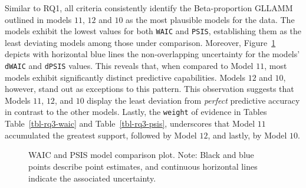 \documentclass[
]{agujournal2019}
\begin{document}
Similar to RQ1, all criteria consistently identify the Beta-proportion
GLLAMM outlined in models \(11\), \(12\) and \(10\) as the most
plausible models for the data. The models exhibit the lowest values for
both \texttt{WAIC} and \texttt{PSIS}, establishing them as the least
deviating models among those under comparison. Moreover,
Figure~\ref{fig-rq3-waic-psis} depicts with horizontal blue lines the
non-overlapping uncertainty for the models' \texttt{dWAIC} and
\texttt{dPSIS} values. This reveals that, when compared to Model \(11\),
most models exhibit significantly distinct predictive capabilities.
Models \(12\) and \(10\), however, stand out as exceptions to this
pattern. This observation suggests that Models \(11\), \(12\), and
\(10\) display the least deviation from \emph{perfect} predictive
accuracy in contrast to the other models. Lastly, the \texttt{weight} of
evidence in Tables Table~\ref{tbl-rq3-waic} and
Table~\ref{tbl-rq3-psis}, underscores that Model \(11\) accumulated the
greatest support, followed by Model \(12\), and lastly, by Model \(10\).

\label{cell-fig-rq3-waic-psis}
\begin{figure}[H]


\caption{\label{fig-rq3-waic-psis}WAIC and PSIS model comparison plot.
Note: Black and blue points describe point estimates, and continuous
horizontal lines indicate the associated uncertainty.}

\end{figure}%
\end{document}
